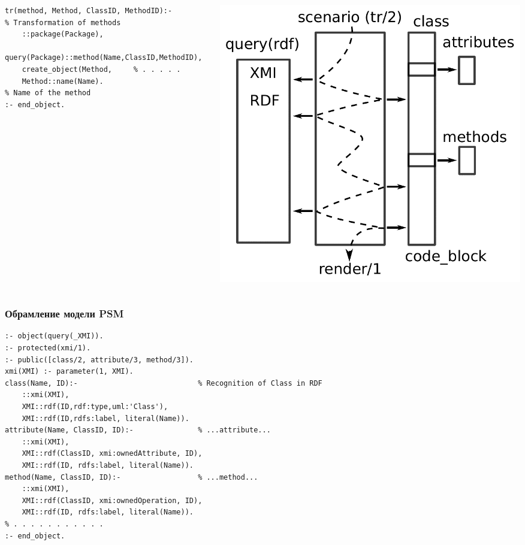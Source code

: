 \documentclass[handout]{beamer}
\begin{document}
\begin{frame}[fragile]
\begin{columns}
\begin{column}{0.6\textwidth}
\begin{verbatim}
tr(method, Method, ClassID, MethodID):-              % Transformation of methods
    ::package(Package),
    query(Package)::method(Name,ClassID,MethodID),
    create_object(Method,     % . . . . .
    Method::name(Name).                              % Name of the method
:- end_object.
\end{verbatim}
    \end{column}
    \begin{column}{0.4\linewidth}
      \includegraphics[width=1\linewidth]{scenario.pdf}
    \end{column}
  \end{columns}
\end{frame}

\begin{frame}[fragile]
  \frametitle{Обрамление модели PSM}
\begin{verbatim}
:- object(query(_XMI)).
:- protected(xmi/1).
:- public([class/2, attribute/3, method/3]).
xmi(XMI) :- parameter(1, XMI).
class(Name, ID):-                            % Recognition of Class in RDF
    ::xmi(XMI),
    XMI::rdf(ID,rdf:type,uml:'Class'),
    XMI::rdf(ID,rdfs:label, literal(Name)).
attribute(Name, ClassID, ID):-               % ...attribute...
    ::xmi(XMI),
    XMI::rdf(ClassID, xmi:ownedAttribute, ID),
    XMI::rdf(ID, rdfs:label, literal(Name)).
method(Name, ClassID, ID):-                  % ...method...
    ::xmi(XMI),
    XMI::rdf(ClassID, xmi:ownedOperation, ID),
    XMI::rdf(ID, rdfs:label, literal(Name)).
% . . . . . . . . . . .
:- end_object.
\end{verbatim}
\end{frame}
\end{document}
